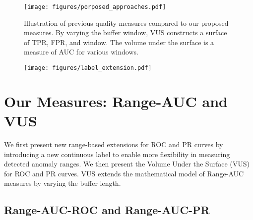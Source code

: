 
\begin{figure*}
  \centering
  \texttt{[image: figures/porposed\_approaches.pdf]}
  \caption{Illustration of previous quality measures compared to our proposed measures. By varying the buffer window, VUS constructs a surface of TPR, FPR, and window. The volume under the surface is a measure of AUC for various windows. }
  \label{fig:auc_volume}
\end{figure*}

\begin{figure}
  \centering
  \texttt{[image: figures/label\_extension.pdf]}
  \caption{}
  \label{fig:label_extension}
\end{figure}

\section{Our Measures: Range-AUC and VUS}

We first present new range-based extensions for ROC and PR curves by introducing a new continuous label to enable more flexibility in measuring detected anomaly ranges. We then present the Volume Under the Surface (VUS) for ROC and PR curves. VUS extends the mathematical model of Range-AUC measures by varying the buffer length. 

\subsection{Range-AUC-ROC and Range-AUC-PR}
\label{sec:range-auc}

